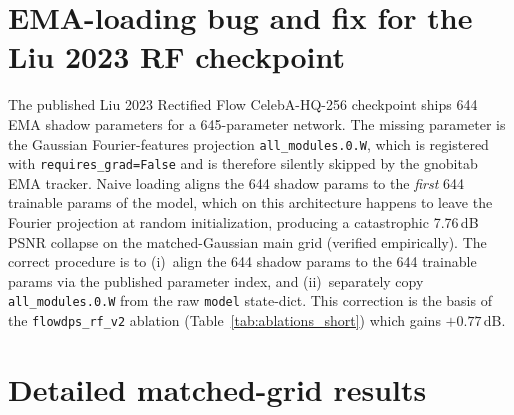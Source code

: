 \documentclass{article}
\begin{document}



\appendix

\section{EMA-loading bug and fix for the Liu 2023 RF checkpoint}
\label{app:ema}

The published Liu 2023 Rectified Flow CelebA-HQ-256 checkpoint ships
644 EMA shadow parameters for a 645-parameter network. The missing
parameter is the Gaussian Fourier-features projection
\texttt{all\_modules.0.W}, which is registered with
\texttt{requires\_grad=False} and is therefore silently skipped by the
gnobitab EMA tracker. Naive loading aligns the 644 shadow params to the
\emph{first} 644 trainable params of the model, which on this
architecture happens to leave the Fourier projection at random
initialization, producing a catastrophic 7.76\,dB PSNR collapse on the
matched-Gaussian main grid (verified empirically). The correct
procedure is to (i)~align the 644 shadow params to the 644 trainable
params via the published parameter index, and (ii)~separately copy
\texttt{all\_modules.0.W} from the raw \texttt{model} state-dict.
This correction is the basis of the \texttt{flowdps\_rf\_v2} ablation
(Table~\ref{tab:ablations_short}) which gains $+0.77$\,dB.

\section{Detailed matched-grid results}
\label{app:detailed_results}
\end{document}
